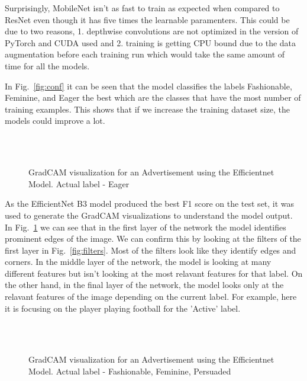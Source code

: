\documentclass[conference]{IEEEtran}
\begin{document}
 Surprisingly, MobileNet isn't as fast to train as expected when compared to ResNet even though 
it has five times the learnable paramenters. This could be due to two reasons, 1. depthwise 
convolutions are not optimized in the version of PyTorch and CUDA used and 2. training is 
getting CPU bound due to the data augmentation before each training run which would take the 
same amount of time for all the models. 


In Fig.~\ref{fig:conf} it can be seen that the model classifies the labels Fashionable, Feminine, and Eager
 the best which are the classes that have the most number of training examples. This shows that if we 
 increase the training dataset size, the models could improve a lot.

\begin{figure}
    
    \\
    \\
    \caption{GradCAM visualization for an Advertisement using the Efficientnet Model. Actual label - Eager}
    \label{fig:gradcam_1}
  \end{figure}



As the EfficientNet B3 model produced the best F1 score on the test set, it was used 
to generate the GradCAM visualizations to understand the model output. 
In Fig.~\ref{fig:gradcam_1} we can see that in the first layer of the network the model 
identifies prominent edges of the image. We can confirm this by looking at the filters 
of the first layer in Fig.~\ref{fig:filters}. Most of the filters look like they identify 
edges and corners. In the middle layer of the network, the model is looking at many 
different features but isn't looking at the most relavant features for that label. On 
the other hand, in the final layer of the network, the model looks only at the relavant 
features of the image depending on the current label. For example, here it is focusing 
on the player playing football for the 'Active' label. 

\begin{figure}
    
    \\
    \\
    \caption{GradCAM visualization for an Advertisement using the Efficientnet Model. Actual label - Fashionable, Feminine, Persuaded}
    \label{fig:gradcam_2}
  \end{figure}
\end{document}
